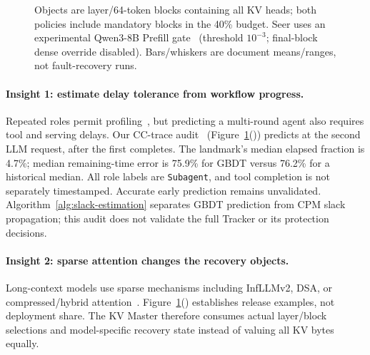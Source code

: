 \begin{figure}[t]
{    Objects are layer/64-token blocks containing all KV heads; both
    policies include mandatory blocks in the 40\% budget.
    Seer uses an experimental Qwen3-8B Prefill gate~\cite{song2026seerqwen3}
    (threshold $10^{-3}$; final-block dense override disabled).
    Bars/whiskers are document means/ranges, not fault-recovery runs.}
  \label{fig:design-insights}
\end{figure}

\paragraph{Insight 1: estimate delay tolerance from workflow progress.}
Repeated roles permit profiling~\cite{yu2026pythia}, but predicting a
multi-round agent also requires tool and serving delays. Our CC-trace
audit~\cite{semianalysis2026cctraces}
(Figure~\ref{fig:design-insights}())
predicts at the second LLM request, after the first completes.
The landmark's median elapsed fraction is 4.7\%; median remaining-time
error is 75.9\% for GBDT versus 76.2\% for a historical median.
All role labels are \texttt{Subagent}, and tool completion is not
separately timestamped. Accurate early prediction remains unvalidated.
Algorithm~\ref{alg:slack-estimation} separates GBDT
prediction from CPM slack propagation; this audit does not validate
the full Tracker or its protection decisions.

\paragraph{Insight 2: sparse attention changes the recovery objects.}
Long-context models use sparse mechanisms including InfLLMv2,
DSA, or compressed/hybrid attention~\cite{minicpm4model,
openbmb2025minicpm41,deepseek2025v32exp,deepseek2025v32model,
zai2026glm5model,openbmb2026sala,deepseek2026v4model,minimax2026m3,
zai2026glm52,longcat2026sparse}.
Figure~\ref{fig:design-insights}()
establishes release examples, not deployment share.
The KV Master therefore consumes actual layer/block selections and
model-specific recovery state instead of valuing all KV bytes equally.

